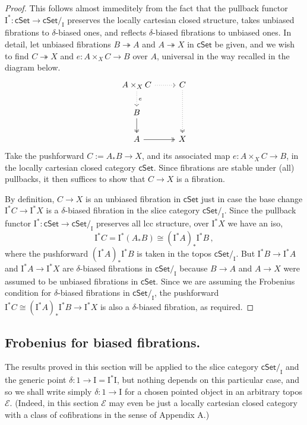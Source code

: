 \documentclass[11pt,reqno]{amsart}
\newcommand{\EE}{\ensuremath{\mathcal{E}}}
\newcommand{\cSet}{\ensuremath{\mathsf{cSet}}}
\newcommand{\slice}[1]{\ensuremath{/_{\!{#1}}}}
\newcommand{\ra}{\ensuremath{\rightarrow}}
\newcommand{\fib}{\ensuremath{\twoheadrightarrow}}
\renewcommand{\to}{\ensuremath{\rightarrow}}
\newcommand{\I}{\ensuremath{\mathrm{I}}}
\theoremstyle{remark}
\theoremstyle{definition}
\begin{document}
\begin{proof}
This follows almost immeditely from the fact that the pullback functor $\I^* : \cSet \to \cSet\slice{\I}$ preserves the locally cartesian closed structure, takes unbiased fibrations to $\delta$-biased ones, and reflects $\delta$-biased fibrations to unbiased ones.  In detail, let unbiased fibrations $B \fib A$ and $A \fib X$ in $\cSet$ be given, and we wish to find $C\fib X$ and $e : A\times_X C \to B$ over $A$, universal in the way recalled in the diagram below.
\begin{equation}\label{diagram:biasedFrobenius2unbiasedFrobenius}
\begin{tikzcd}
A \times_X C \ar[d, dotted, "e"] \ar[r, dotted] & C \ar[dd, two heads, dotted]\\
B \ar[d, two heads] &   \\
A \ar[r, two heads]  & X 
\end{tikzcd}
\end{equation}
%
Take the pushforward $C := A_*B \to X$, and its associated map $e : A\times_X C \to B$, in the locally cartesian closed category $\cSet$.  Since fibrations are stable under (all) pullbacks, it then suffices to show that $C\to X$ is a fibration.  

By definition, $C\to X$ is an unbiased fibration in $\cSet$ just in case the base change $\I^*C \to \I^*X$ is a $\delta$-biased fibration in the slice category $\cSet\slice{\I}$.  Since the pullback functor $\I^* : \cSet \to \cSet\slice{\I}$ preserves all lcc structure, over $\I^*X$ we have an iso,
\[
\I^*C = \I^*(A_*B) \cong (\I^*A)_*\I^*B\,,
\]
where the pushforward $(\I^*A)_*\I^*B$ is taken in the topos $\cSet\slice{\I}$.  But $\I^*B \to \I^*A$ and $\I^*A \to \I^*X$ are $\delta$-biased fibrations in $\cSet\slice{\I}$ because $B \to A$ and $A \to X$ were assumed to be unbiased fibrations in $\cSet$.  Since we are assuming the Frobenius condition for $\delta$-biased fibrations in $\cSet\slice{\I}$, the pushforward $\I^*C \cong (\I^*A)_*\I^*B \to \I^*X$ is also a $\delta$-biased fibration, as required.
\end{proof}
  
\subsection*{Frobenius for biased fibrations.}

The results proved in this section will be applied to the slice category $\cSet\slice{\I}$ and the generic point $\delta : 1 \ra \I = \I^*\I$, but nothing depends on this particular case, and so we shall write simply $\delta : 1\to \I$ for a chosen pointed object in an arbitrary topos $\EE$.  (Indeed, in this section $\EE$ may even be just a locally cartesian closed category with a class of cofibrations in the sense of Appendix A.)
\end{document}
